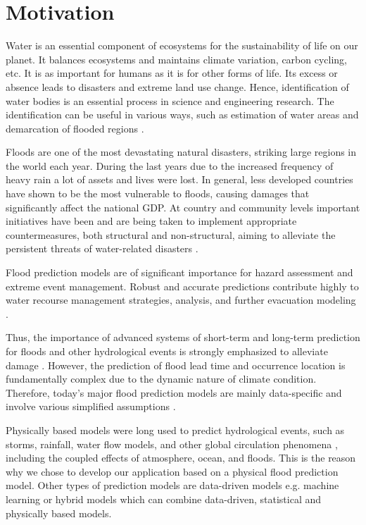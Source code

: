 \documentclass[12pt, a4paper]{report}
\begin{document}
\section{Motivation}
\quad
Water is an essential component of ecosystems for the sustainability of life on our planet. It balances ecosystems and maintains climate variation, carbon cycling, etc. It is as important for humans as it is for other forms of life. Its excess or absence leads to disasters and extreme land use change. Hence, identification of water bodies is an essential process in science and engineering research. The identification can be useful in various ways, such as estimation of water areas and demarcation of flooded regions \cite {Rover, Alsdorf}.
\par 

Floods are one of the most devastating natural disasters, striking large regions in the world each year. During the last years due to the increased frequency of heavy rain a lot of assets and lives were lost. In general, less developed countries have shown to be the most vulnerable to floods, causing damages that significantly affect the national GDP. At country and community levels important initiatives have been and are being taken to implement appropriate countermeasures, both structural and non-structural, aiming to alleviate the persistent threats of water-related disasters \cite{Flood-forecasting}.  
\par

Flood prediction models are of significant importance for hazard assessment and extreme event management. Robust and accurate predictions contribute highly to water recourse management strategies, analysis, and further evacuation modeling \cite{Xie}.
\par

Thus, the importance of advanced systems of short-term and long-term prediction for floods and other hydrological events is strongly emphasized to alleviate damage \cite{Pitt}. However, the prediction of flood lead time and occurrence location is fundamentally complex due to the dynamic nature of climate condition. Therefore, today’s major flood prediction models are mainly data-specific and involve various simplified assumptions \cite{Lohani}. 
\par

Physically based models were long used to predict hydrological events, such as storms, rainfall, water flow models, and other global circulation phenomena , including the coupled effects of atmosphere, ocean, and floods. This is the reason why we chose to develop our application based on a physical flood prediction model. Other types of prediction models are data-driven models e.g. machine learning or hybrid models which can combine data-driven, statistical and physically based models.
\par 
\end{document}
